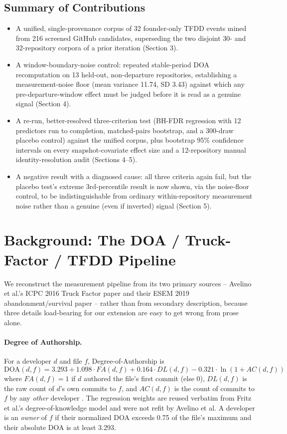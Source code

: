 \documentclass[11pt,letterpaper]{article}
\begin{document}
\subsection*{Summary of Contributions}

\begin{itemize}
\item A unified, single-provenance corpus of 32 founder-only TFDD events mined from 216 screened GitHub candidates, superseding the two disjoint 30- and 32-repository corpora of a prior iteration (Section 3).
\item A window-boundary-noise control: repeated stable-period DOA recomputation on 13 held-out, non-departure repositories, establishing a measurement-noise floor (mean variance 11.74, SD 3.43) against which any pre-departure-window effect must be judged before it is read as a genuine signal (Section 4).
\item A re-run, better-resolved three-criterion test (BH-FDR regression with 12 predictors run to completion, matched-pairs bootstrap, and a 300-draw placebo control) against the unified corpus, plus bootstrap 95\% confidence intervals on every snapshot-covariate effect size and a 12-repository manual identity-resolution audit (Sections 4--5).
\item A negative result with a diagnosed cause: all three criteria again fail, but the placebo test's extreme 3rd-percentile result is now shown, via the noise-floor control, to be indistinguishable from ordinary within-repository measurement noise rather than a genuine (even if inverted) signal (Section 5).
\end{itemize}

\section{Background: The DOA / Truck-Factor / TFDD Pipeline}

We reconstruct the measurement pipeline from its two primary sources -- Avelino et al.'s ICPC 2016 Truck Factor paper \citep{Avelino2016} and their ESEM 2019 abandonment/survival paper \citep{Avelino2019} -- rather than from secondary description, because three details load-bearing for our extension are easy to get wrong from prose alone.

\paragraph{Degree of Authorship.} For a developer $d$ and file $f$, Degree-of-Authorship is
$$\mathrm{DOA}(d,f) = 3.293 + 1.098\cdot FA(d,f) + 0.164\cdot DL(d,f) - 0.321\cdot\ln(1+AC(d,f))$$
where $FA(d,f)=1$ if $d$ authored the file's first commit (else 0), $DL(d,f)$ is the raw count of $d$'s own commits to $f$, and $AC(d,f)$ is the count of commits to $f$ by any \emph{other} developer \citep{Avelino2016}. The regression weights are reused verbatim from Fritz et al.'s degree-of-knowledge model \citep{Fritz2010} and were not refit by Avelino et al. A developer is an \emph{owner} of $f$ if their normalized DOA exceeds 0.75 of the file's maximum and their absolute DOA is at least 3.293.
\end{document}

